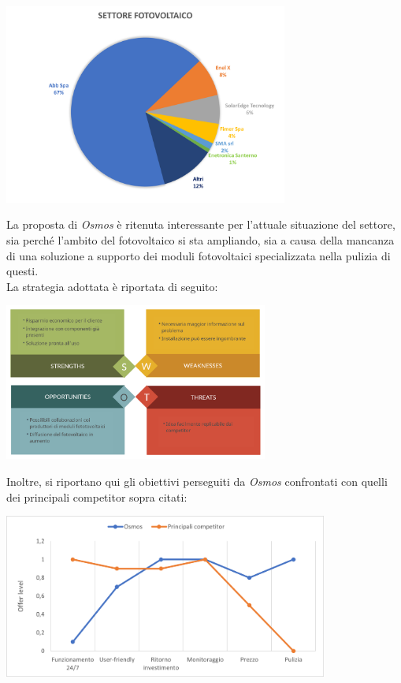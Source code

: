 \documentclass[a4paper, 12pt]{article}
\begin{document}
	\begin{center}
		\includegraphics[width=0.7\textwidth]{Images/suddivisione_settore.png}
	\end{center}
	La proposta di \emph{Osmos} è ritenuta interessante per l'attuale situazione del settore, sia perché l'ambito del fotovoltaico si sta ampliando, sia a causa della mancanza di una soluzione a supporto dei moduli fotovoltaici specializzata nella pulizia di questi.\\
	La strategia adottata è riportata di seguito:
	\begin{center}
		\includegraphics[width=0.65\textwidth]{Images/SWOT2.png}%
	\end{center}
	Inoltre, si riportano qui gli obiettivi perseguiti da \emph{Osmos} confrontati con quelli dei principali competitor sopra citati:
	\begin{center}
		\includegraphics[width=0.8\textwidth]{Images/curve_valore.png}%
	\end{center}
\end{document}
